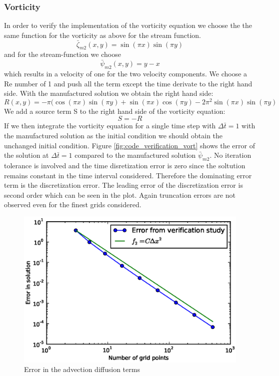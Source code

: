 \subsubsection{Vorticity}
In order to verify the implementation of the vorticity equation we choose the the same function for the vorticity as above for the stream function.
\begin{equation}
\bar{\zeta}_{m2}(x,y) = \sin(\pi x) \sin(\pi y)
\end{equation}
and for the stream-function we choose
\begin{equation}
\bar{\psi}_{m2}(x,y) = y-x
\end{equation}
which results in a velocity of one for the two velocity components. We choose a Re number of 1 and push all the term except the time derivate to the right hand side. With the manufactured solution we obtain the right hand side:
\begin{equation}
R (x,y) = -\pi (\cos(\pi x) \sin(\pi y) + \sin(\pi x) \cos(\pi y) - 2 \pi ^2 \sin(\pi x) \sin(\pi y) 
\end{equation}
We add a source term S to the right hand side of the vorticity equation:
\begin{equation}
S = -R
\end{equation}
If we then integrate the vorticity equation for a single time step with $\Delta \bar{t}=1$ with the manufactured solution as the initial condition we should obtain the unchanged initial condition. Figure \ref{fig:code_verification_vort} shows the error of the solution at $\Delta \bar{t}=1$ compared to the manufactured solution $\bar{\psi}_{m2}$. No iteration tolerance is involved and the time disretization error is zero since the soltution remains constant in the time interval considered. Therefore the dominating error term is the discretization error. The leading error of the discretization error is second order which can be seen in the plot. Again truncation errors are not observed even for the finest grids considered.
%
\begin{figure}[H]
\centering
\includegraphics[scale=0.8]{"figs/code_verification_euler"}
\caption{Error in the advection diffusion terms}
\label{fig:code_verification_euler}
\end{figure}
%
